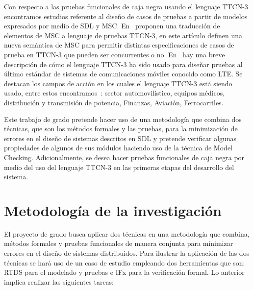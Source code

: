 Con respecto a las pruebas funcionales de caja negra usando el lenguaje TTCN-3 encontramos estudios referente al diseño de casos de pruebas a partir de modelos expresados por medio de SDL y MSC. En~\cite{Ebner} proponen una traducci\'on de elementos de MSC a lenguaje de pruebas TTCN-3, en este art\'iculo definen una nueva sem\'antica de MSC para permitir distintas especificaciones de casos de prueba en TTCN-3 que pueden ser concurrentes o no. En~\cite{Willcock2011} hay una breve descripci\'on de c\'omo el lenguaje TTCN-3 ha sido usado para diseñar pruebas al \'ultimo est\'andar de sistemas de comunicaciones m\'oviles conocido como LTE. Se destacan los campos de acci\'on en los cuales el lenguaje TTCN-3 est\'a siendo usado, entre estos encontramos~\cite{Schieferdecker}: sector automovil\'istico,  equipos m\'edicos, distribuci\'on y transmisi\'on de potencia, Finanzas, Aviaci\'on, Ferrocarriles.

Este trabajo de grado pretende hacer uso de una metodolog\'ia que combina dos t\'ecnicas, que son los m\'etodos formales y las pruebas, para la minimizaci\'on de errores en el diseño de sistemas descritos en SDL y pretende verificar algunas propiedades de algunos de sus m\'odulos haciendo uso de la t\'ecnica de Model Checking. Adicionalmente, se desea hacer pruebas funcionales de caja negra por medio del uso del lenguaje TTCN-3 en las primeras etapas del desarrollo del sistema.
 


\section{Metodolog\'ia de la investigaci\'on}


El proyecto de grado busca aplicar dos t\'ecnicas en una metodolog\'ia que combina, m\'etodos formales y pruebas funcionales de manera conjunta para minimizar errores en el dise\~no de sistemas distribuidos. Para ilustrar la aplicaci\'on de las dos t\'ecnicas se har\'a uso de un caso de estudio empleando dos herramientas que son: RTDS para el modelado y pruebas e IFx para la verificaci\'on formal. Lo anterior implica realizar las siguientes tareas:

